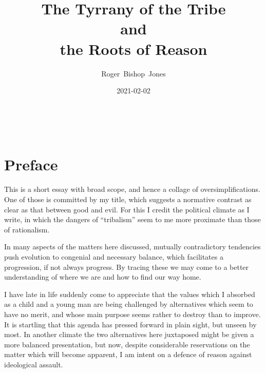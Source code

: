 \documentclass[10pt,titlepage]{article}
\title{\bf\LARGE The Tyrrany of the Tribe\\and\\the Roots of Reason}
\author{Roger~Bishop~Jones}
\date{\small 2021-02-02}
\newcommand{\ignore}[1]{}
\begin{document}
%
% 
                               
\begin{titlepage}
\maketitle





\end{titlepage}

\ \

\ignore{
\begin{centering}
{}
\end{centering}
}%

\setcounter{tocdepth}{4}
{\parskip-0pt\tableofcontents}


\pagebreak

\section*{Preface}


This is a short essay with broad scope, and hence a collage of oversimplifications.
One of those is committed by my title, which suggests a normative contrast as clear as that between good and evil.
For this I credit the political climate as I write, in which the dangers of ``tribalism'' seem to me more proximate than those of rationalism.

In many aspects of the matters here discussed, mutually contradictory tendencies push evolution to congenial and necessary balance, which facilitates a progression, if not always progress.
By tracing these we may come to a better understanding of where we are and how to find our way home.

I have late in life suddenly come to appreciate that the values which I absorbed as a child and a young man are being challenged by alternatives which seem to have no merit, and whose main purpose seems rather to destroy than to improve.
It is startling that this agenda has pressed forward in plain sight, but unseen by most.
In another climate the two alternatives here juxtaposed might be given a more balanced presentation, but now, despite considerable reservations on the matter which will become apparent, I am intent on a defence of reason against ideological assault.
\end{document}
